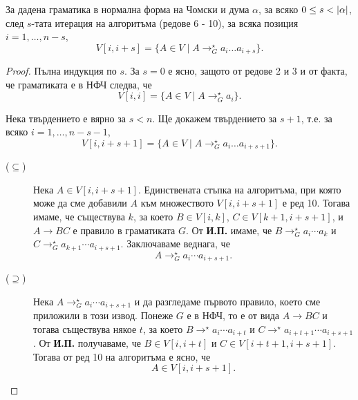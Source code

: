 \begin{lemma}
  За дадена граматика в нормална форма на Чомски и дума $\alpha$, 
  за всяко $0 \leq s < \vert{\alpha}\vert$, след $s$-тата итерация на алгоритъма (редове 6 - 10), за всяка позиция $i = 1,\dots,n-s$,
  \[V[i,i+s] = \{A \in V \mid A \rightarrow^\star_G a_i\dots a_{i+s}\}.\]
\end{lemma}
\begin{proof}
  Пълна индукция по $s$.
  За $s = 0$ е ясно, защото от редове 2 и 3 и от факта, че граматиката е в НФЧ следва, че
  \[V[i,i] = \{A \in V \mid A \to^\star_G a_i\}.\]

  Нека твърдението е вярно за $s < n$. Ще докажем твърдението за $s+1$, т.е. за всяко $i = 1,\dots,n-s-1$,
  \[V[i,i+s+1] = \{A \in V \mid A \rightarrow^\star_G a_i\dots a_{i+s+1}\}.\]
  \begin{description}
  \item[($\subseteq$)]
    Нека $A \in V[i,i+s+1]$.
    Единствената стъпка на алгоритъма, при която може да сме добавили $A$ към множеството $V[i,i+s+1]$ е ред 10.
    Тогава имаме, че съществува $k$, за което $B \in V[i,k]$, $C \in V[k+1,i+s+1]$, и $A\to BC$ е правило в граматиката $G$.
    От {\bf И.П.} имаме, че $B \to^\star_G a_i\cdots a_k$ и $C \to^\star_G a_{k+1}\cdots a_{i+s+1}$.
    Заключаваме веднага, че 
    \[A \to^\star_G a_i\cdots a_{i+s+1}.\]
  \item[($\supseteq$)]
    Нека $A \to^\star_G a_i\cdots a_{i+s+1}$ и да разгледаме първото правило, което сме приложили в този извод.
    Понеже $G$ е в НФЧ, то е от вида $A \to BC$ и тогава съществува някое $t$, за което 
    $B \to^\star a_i\cdots a_{i+t}$ и $C \to^\star a_{i+t+1}\cdots a_{i+s+1}$.
    От {\bf И.П.} получаваме, че $B \in V[i,i+t]$ и $C \in V[i+t+1,i+s+1]$.
    Тогава от ред 10 на алгоритъма е ясно, че 
    \[A \in V[i,i+s+1].\]
  \end{description}
\end{proof}

